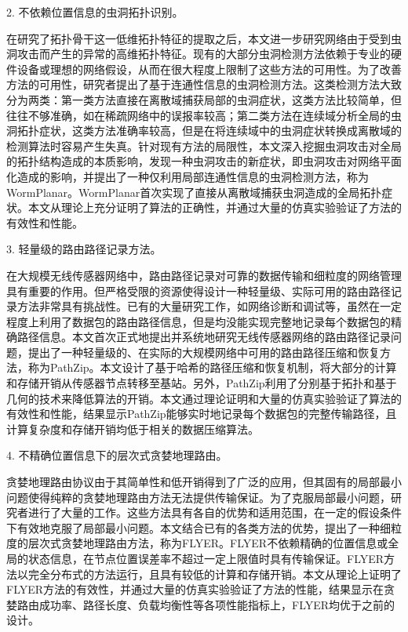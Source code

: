 2. 不依赖位置信息的虫洞拓扑识别。

在研究了拓扑骨干这一低维拓扑特征的提取之后，本文进一步研究网络由于受到虫洞攻击而产生的异常的高维拓扑特征。现有的大部分虫洞检测方法依赖于专业的硬件设备或理想的网络假设，从而在很大程度上限制了这些方法的可用性。为了改善方法的可用性，研究者提出了基于连通性信息的虫洞检测方法。这类检测方法大致分为两类：第一类方法直接在离散域捕获局部的虫洞症状，这类方法比较简单，但往往不够准确，如在稀疏网络中的误报率较高；第二类方法在连续域分析全局的虫洞拓扑症状，这类方法准确率较高，但是在将连续域中的虫洞症状转换成离散域的检测算法时容易产生失真。针对现有方法的局限性，本文深入挖掘虫洞攻击对全局的拓扑结构造成的本质影响，发现一种虫洞攻击的新症状，即虫洞攻击对网络平面化造成的影响，并提出了一种仅利用局部连通性信息的虫洞检测方法，称为WormPlanar。WormPlanar首次实现了直接从离散域捕获虫洞造成的全局拓扑症状。本文从理论上充分证明了算法的正确性，并通过大量的仿真实验验证了方法的有效性和性能。

3. 轻量级的路由路径记录方法。

在大规模无线传感器网络中，路由路径记录对可靠的数据传输和细粒度的网络管理具有重要的作用。但严格受限的资源使得设计一种轻量级、实际可用的路由路径记录方法非常具有挑战性。已有的大量研究工作，如网络诊断和调试等，虽然在一定程度上利用了数据包的路由路径信息，但是均没能实现完整地记录每个数据包的精确路径信息。本文首次正式地提出并系统地研究无线传感器网络的路由路径记录问题，提出了一种轻量级的、在实际的大规模网络中可用的路由路径压缩和恢复方法，称为PathZip。本文设计了基于哈希的路径压缩和恢复机制，将大部分的计算和存储开销从传感器节点转移至基站。另外，PathZip利用了分别基于拓扑和基于几何的技术来降低算法的开销。本文通过理论证明和大量的仿真实验验证了算法的有效性和性能，结果显示PathZip能够实时地记录每个数据包的完整传输路径，且计算复杂度和存储开销均低于相关的数据压缩算法。

4. 不精确位置信息下的层次式贪婪地理路由。

贪婪地理路由协议由于其简单性和低开销得到了广泛的应用，但其固有的局部最小问题使得纯粹的贪婪地理路由方法无法提供传输保证。为了克服局部最小问题，研究者进行了大量的工作。这些方法具有各自的优势和适用范围，在一定的假设条件下有效地克服了局部最小问题。本文结合已有的各类方法的优势，提出了一种细粒度的层次式贪婪地理路由方法，称为FLYER。FLYER不依赖精确的位置信息或全局的状态信息，在节点位置误差率不超过一定上限值时具有传输保证。FLYER方法以完全分布式的方法运行，且具有较低的计算和存储开销。本文从理论上证明了FLYER方法的有效性，并通过大量的仿真实验验证了方法的性能，结果显示在贪婪路由成功率、路径长度、负载均衡性等各项性能指标上，FLYER均优于之前的设计。
